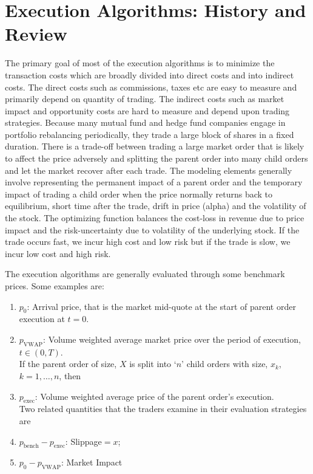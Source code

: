 \section{Execution Algorithms:  History and Review}


The primary goal of most of the execution algorithms is to minimize the transaction costs which are broadly divided into direct costs and into indirect costs. The direct costs such as commissions, taxes etc are easy to measure and primarily depend on quantity of trading. The indirect costs such as market impact and opportunity costs are hard to measure and depend upon trading strategies. Because many mutual fund and hedge fund companies engage in portfolio rebalancing periodically, they trade a large block of shares in a fixed duration. There is a trade-off between trading a large market order that is likely to affect the price adversely and splitting the parent order into many child orders and let the market recover after each trade. The modeling elements generally involve representing the permanent impact of a parent order and the temporary impact of trading a child order when the price normally returns back to equilibrium, short time after the trade, drift in price (alpha) and the volatility of the stock. The optimizing function balances the cost-loss in revenue due to price impact and the risk-uncertainty due to volatility of the underlying stock. If the trade occurs fast, we incur high cost and low risk but if the trade is slow, we incur low cost and high risk.


The execution algorithms are generally evaluated through some benchmark prices. Some examples are:
	\begin{enumerate}[--]
	\item $p_0$: Arrival price, that is the market mid-quote at the start of parent order execution at $t=0$.
	
	\item $p_{\text{VWAP}}$: Volume weighted average market price over the period of execution, $t \in (0,T)$. \\
	
	If the parent order of size, $X$ is split into `$n$' child orders with size, $x_k$, $k=1,\ldots,n$, then
	
	\item $p_{\text{exec}}$: Volume weighted average price of the parent order's execution. \\
	
	Two related quantities that the traders examine in their evaluation strategies are
	
	\item $p_{\text{bench}}-p_{\text{exec}}$: Slippage$=x$;
	
	\item $p_0-p_{\text{VWAP}}$: Market Impact 
	\end{enumerate}
	
